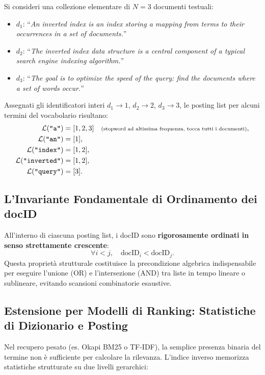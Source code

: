 \begin{example}
Si consideri una collezione elementare di $N = 3$ documenti testuali:
\begin{itemize}
    \item $d_1$: ``\textit{An inverted index is an index storing a mapping from terms to their occurrences in a set of documents.}''
    \item $d_2$: ``\textit{The inverted index data structure is a central component of a typical search engine indexing algorithm.}''
    \item $d_3$: ``\textit{The goal is to optimize the speed of the query: find the documents where a set of words occur.}''
\end{itemize}
Assegnati gli identificatori interi $d_1 \to 1$, $d_2 \to 2$, $d_3 \to 3$, le posting list per alcuni termini del vocabolario risultano:
\begin{align*}
\mathcal{L}(\text{\texttt{"a"}}) &= [1, 2, 3] \quad \text{\scriptsize (stopword ad altissima frequenza, tocca tutti i documenti)}, \\
\mathcal{L}(\text{\texttt{"an"}}) &= [1], \\
\mathcal{L}(\text{\texttt{"index"}}) &= [1, 2], \\
\mathcal{L}(\text{\texttt{"inverted"}}) &= [1, 2], \\
\mathcal{L}(\text{\texttt{"query"}}) &= [3].
\end{align*}
\end{example}

\FloatBarrier
\subsection{L'Invariante Fondamentale di Ordinamento dei docID}
All'interno di ciascuna posting list, i docID sono \textbf{rigorosamente ordinati in senso strettamente crescente}:
\begin{equation}
\forall i < j, \quad \text{docID}_i < \text{docID}_j.
\label{eq:ordinamento-invariante}
\end{equation}
Questa propriet\`a strutturale costituisce la precondizione algebrica indispensabile per eseguire l'unione (OR) e l'intersezione (AND) tra liste in tempo lineare o sublineare, evitando scansioni combinatorie esaustive.

\FloatBarrier
\subsection{Estensione per Modelli di Ranking: Statistiche di Dizionario e Posting}
Nel recupero pesato (es. Okapi BM25 o TF-IDF), la semplice presenza binaria del termine non \`e sufficiente per calcolare la rilevanza. L'indice inverso memorizza statistiche strutturate su due livelli gerarchici:

